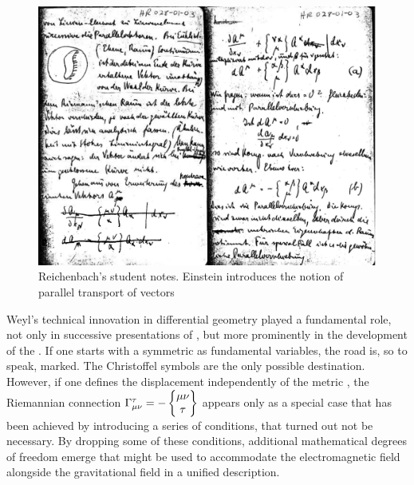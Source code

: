 \documentclass[draft]{article}
\begin{document}

\begin{figure}
\begin{center}
 \includegraphics[scale=0.12, trim = 0mm 0mm 0mm 0mm, clip]{parallelverschiebungDOUB.png}
\caption{Reichenbach's student notes. Einstein introduces the notion of parallel transport of vectors}
\label{fig:parallel}
\end{center}
\end{figure}

Weyl's technical innovation in differential geometry played a fundamental role, not only in successive presentations of \gr \citep[see][45ff.]{Einstein1922}, but more prominently in the development of the \uftp. If one starts with a symmetric \gmn as fundamental variables, the road is, so to speak, marked. The Christoffel symbols are the only possible destination. However, if one defines the displacement \Gtmn independently of the metric \gmn, the Riemannian connection $\Gamma^\tau_{\mu\nu} = - \begin{Bmatrix} \mu \nu \\ \tau \end{Bmatrix}$ appears only as a special case that has been achieved by introducing a series of conditions, that turned out not be necessary. By dropping some of these conditions, additional mathematical degrees of freedom emerge that might be used to accommodate the electromagnetic field alongside the gravitational field in a unified  description.
\end{document}
